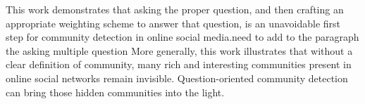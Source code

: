 











This work demonstrates that asking the proper question, and then crafting an appropriate weighting scheme to answer that question, is an unavoidable first step for community detection in online social media.\alert{need to add to the paragraph the asking multiple question} More generally, this work illustrates that without a clear definition of community, many rich and interesting communities present in online social networks remain invisible. Question-oriented community detection can bring those hidden communities into the light.


